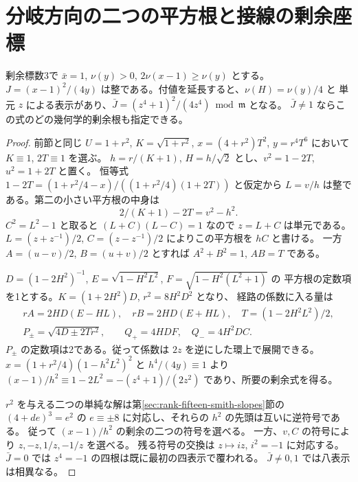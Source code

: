 \section{分岐方向の二つの平方根と接線の剰余座標}
\label{sec:rank-fifteen-ramified-pole}
\begin{lemma}\label{lem:rank-fifteen-ramified-pole}
剰余標数3で $\bar x=1$, $\nu(y)>0$, $2\nu(x-1)\ge\nu(y)$ とする。
$J=(x-1)^2/(4y)$ は整である。付値を延長すると、$\nu(H)=\nu(y)/4$ と
単元 $z$ による表示があり、$\bar J=(z^4+1)^2/(4z^4)\bmod\mathfrak m$ となる。
$\bar J\ne1$ ならこの式のどの幾何学的剰余根も指定できる。
\end{lemma}
\begin{proof}
前節と同じ $U=1+r^2$, $K=\sqrt{1+r^2}$, $x=(4+r^2)T^2$,
$y=r^4T^6$ において $K\equiv1$, $2T\equiv1$ を選ぶ。
$h=r/(K+1)$, $H=h/\sqrt2$ とし、$v^2=1-2T$, $u^2=1+2T$ と置く。
恒等式 $1-2T=(1+r^2/4-x)/((1+r^2/4)(1+2T))$ と仮定から
$L=v/h$ は整である。第二の小さい平方根の中身は
\[
  2/(K+1)-2T=v^2-h^2.
\]
$C^2=L^2-1$ と取ると $(L+C)(L-C)=1$ なので $z=L+C$ は単元である。
$L=(z+z^{-1})/2$, $C=(z-z^{-1})/2$ によりこの平方根を $hC$ と書ける。
一方 $A=(u-v)/2$, $B=(u+v)/2$ とすれば $A^2+B^2=1$, $AB=T$ である。

$D=(1-2H^2)^{-1}$, $E=\sqrt{1-H^2 L^2}$, $F=\sqrt{1-H^2(L^2+1)}$ の
平方根の定数項を1とする。$K=(1+2H^2)D$, $r^2=8H^2D^2$ となり、
経路の係数に入る量は
\[
 \begin{gathered}
  rA=2HD(E-HL),\quad rB=2HD(E+HL),\quad T=(1-2H^2L^2)/2,\\
  P_\pm=\sqrt{4D\pm 2Tr^2},\qquad Q_+=4HDF,\quad Q_-=4H^2DC .
 \end{gathered}
\]
$P_\pm$ の定数項は2である。従って係数は $2z$ を逆にした環上で展開できる。
$x=(1+r^2/4)(1-h^2 L^2)^2$ と $h^4/(4y)\equiv1$ より
$(x-1)/h^2\equiv1-2L^2=-(z^4+1)/(2z^2)$ であり、所要の剰余式を得る。

$r^2$ を与える二つの単純な解は第\ref{sec:rank-fifteen-smith-slopes}節の
$(4+de)^3=e^2$ の $e\equiv\pm8$ に対応し、それらの $h^2$ の先頭は互いに逆符号である。
従って $(x-1)/h^2$ の剰余の二つの符号を選べる。
一方、$v,C$ の符号により $z,-z,1/z,-1/z$ を選べる。
残る符号の交換は $z\mapsto iz$, $i^2=-1$ に対応する。
$\bar J=0$ では $z^4=-1$ の四根は既に最初の四表示で覆われる。
$\bar J\ne0,1$ では八表示は相異なる。
\end{proof}

